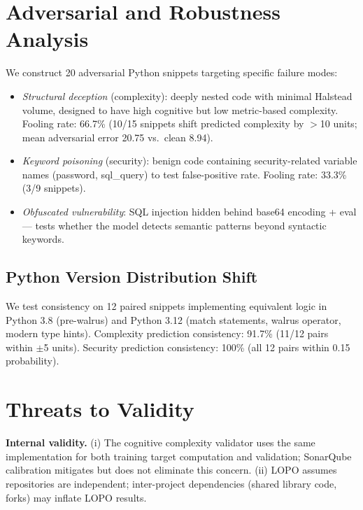 \documentclass[conference]{IEEEtran}
\begin{document}
\section{Adversarial and Robustness Analysis}
\label{sec:adversarial}

We construct 20 adversarial Python snippets targeting specific failure modes:

\begin{itemize}
  \item \emph{Structural deception} (complexity): deeply nested code with
    minimal Halstead volume, designed to have high cognitive but low metric-based
    complexity. Fooling rate: 66.7\% (10/15 snippets shift predicted
    complexity by $>$10 units; mean adversarial error 20.75 vs.\ clean 8.94).
  \item \emph{Keyword poisoning} (security): benign code containing
    security-related variable names (password, sql\_query) to test
    false-positive rate. Fooling rate: 33.3\% (3/9 snippets).
  \item \emph{Obfuscated vulnerability}: SQL injection hidden behind
    base64 encoding + eval --- tests whether the model detects semantic
    patterns beyond syntactic keywords.
\end{itemize}

\subsection{Python Version Distribution Shift}
We test consistency on 12 paired snippets implementing equivalent logic in
Python 3.8 (pre-walrus) and Python 3.12 (match statements, walrus operator,
modern type hints).
Complexity prediction consistency: 91.7\% (11/12 pairs within $\pm$5 units).
Security prediction consistency: 100\% (all 12 pairs within 0.15 probability).

\section{Threats to Validity}
\label{sec:threats}

\textbf{Internal validity.}
(i) The cognitive complexity validator uses the same implementation for
both training target computation and validation; SonarQube calibration
mitigates but does not eliminate this concern.
(ii) LOPO assumes repositories are independent; inter-project dependencies
(shared library code, forks) may inflate LOPO results.
\end{document}
